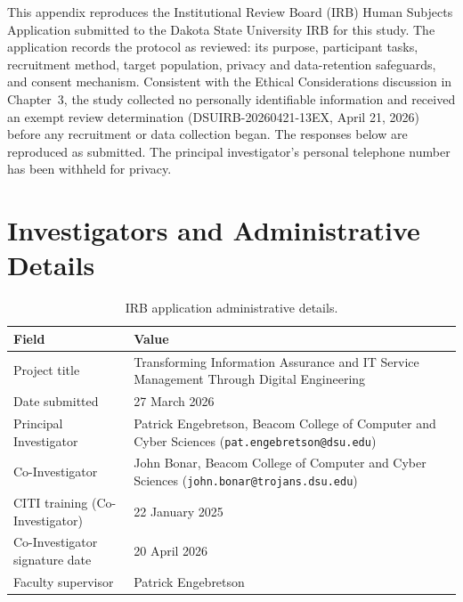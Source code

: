 

\label{appendix:irb}

This appendix reproduces the Institutional Review Board (IRB) Human Subjects Application submitted to the Dakota State University IRB for this study. The application records the protocol as reviewed: its purpose, participant tasks, recruitment method, target population, privacy and data-retention safeguards, and consent mechanism. Consistent with the Ethical Considerations discussion in Chapter~3, the study collected no personally identifiable information and received an exempt review determination (DSUIRB-20260421-13EX, April 21, 2026) before any recruitment or data collection began. The responses below are reproduced as submitted. The principal investigator's personal telephone number has been withheld for privacy.

\section{Investigators and Administrative Details}

\begin{table}[H]
  \centering
  \caption{IRB application administrative details.}\label{tab:irb-admin}
  \begin{tabular}{@{}p{4cm}p{9.2cm}@{}}
    \toprule
    \textbf{Field} & \textbf{Value} \\
    \midrule
    Project title & Transforming Information Assurance and IT Service Management Through Digital Engineering \\
    Date submitted & 27 March 2026 \\
    Principal Investigator & Patrick Engebretson, Beacom College of Computer and Cyber Sciences (\texttt{pat.engebretson@dsu.edu}) \\
    Co-Investigator & John Bonar, Beacom College of Computer and Cyber Sciences (\texttt{john.bonar@trojans.dsu.edu}) \\
    CITI training (Co-Investigator) & 22 January 2025 \\
    Co-Investigator signature date & 20 April 2026 \\
    Faculty supervisor & Patrick Engebretson \\
    \bottomrule
  \end{tabular}
\end{table}

